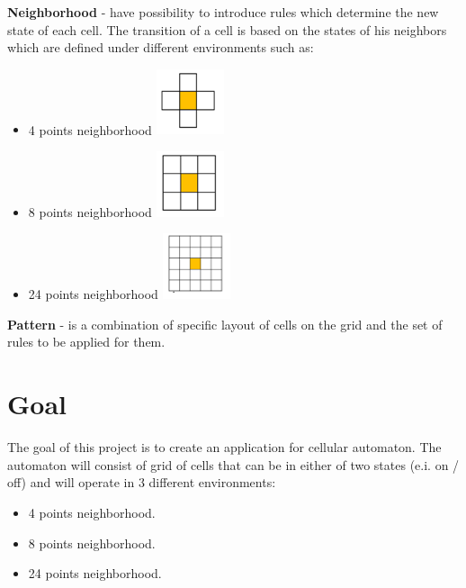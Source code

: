 \documentclass{article}
\begin{document}
\newpage	

\Large {\bf Neighborhood
} 
	-  have possibility to introduce rules which determine the new state of 
	each cell. The transition of a cell is based on the states of his neighbors which are
	defined under different environments such as:
	\begin{itemize}
	
	\item	
		4 points neighborhood \hspace{35pt} 
			 \includegraphics[width=20mm]{images/4_neigh.png} \\

	\item	
		8 points neighborhood \hspace{35pt}
			\includegraphics[width=20mm]{images/8_neigh.png} \\

	\item	
		24 points neighborhood \hspace{35pt}
			\includegraphics[width=20mm]{images/24_neigh.png} \\				
	\end{itemize}

\Large {\bf Pattern
} - is a combination of specific layout of cells on the grid and the set of rules to be applied for them.

\newpage

\section{Goal}

\hspace{15pt}The goal of this project is to create an application for cellular automaton. The automaton will consist of grid of cells that can be in either of two states
(e.i. on / off) and will operate in 3 different environments:
\begin{itemize}
	\item 4 points neighborhood.
	\item 8 points neighborhood.
	\item 24 points neighborhood.
\end{itemize}
\end{document}
